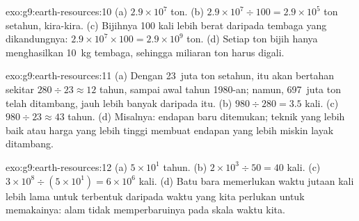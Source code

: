 \begin{solution}{exo:g9:earth-resources:10}
(a) $2.9 \times 10^7$ ton. (b) $2.9 \times 10^7 \div 100 = 2.9 \times
10^5$ ton setahun, kira-kira. (c) Bijihnya 100 kali lebih berat daripada
tembaga yang dikandungnya: $2.9 \times 10^7 \times 100 = 2.9 \times 10^9$
ton. (d) Setiap ton bijih hanya menghasilkan \qty{10}{kg} tembaga,
sehingga miliaran ton  harus digali.
\end{solution}

\begin{solution}{exo:g9:earth-resources:11}
(a) Dengan 23~juta ton setahun,  itu akan bertahan sekitar
$280 \div 23
\approx 12$ tahun, sampai awal tahun 1980-an; namun, 697~juta ton telah
ditambang, jauh lebih banyak daripada  itu.
(b) $980 \div 280 = 3.5$ kali. (c) $980 \div
23 \approx 43$ tahun. (d) Misalnya: endapan baru ditemukan; teknik yang
lebih baik atau harga yang lebih tinggi membuat endapan yang lebih miskin
layak ditambang.
\end{solution}

\begin{solution}{exo:g9:earth-resources:12}
(a) $5 \times 10^1$ tahun. (b) $2 \times 10^3 \div 50 = 40$ kali. (c) $3
\times 10^8 \div (5 \times 10^1) = 6 \times 10^6$ kali. (d) Batu bara
memerlukan waktu jutaan kali lebih lama untuk terbentuk daripada waktu
yang kita perlukan untuk memakainya: alam tidak memperbaruinya pada skala
waktu kita.
\end{solution}

